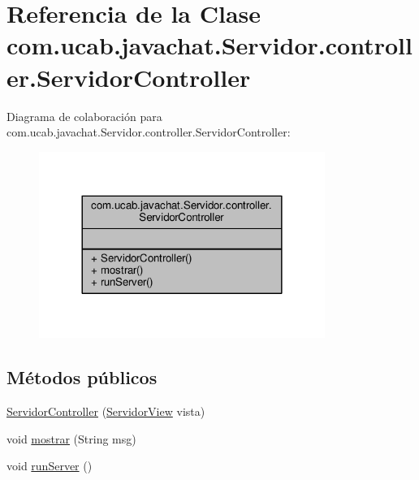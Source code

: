 \hypertarget{classcom_1_1ucab_1_1javachat_1_1_servidor_1_1controller_1_1_servidor_controller}{\section{Referencia de la Clase com.\-ucab.\-javachat.\-Servidor.\-controller.\-Servidor\-Controller}
\label{classcom_1_1ucab_1_1javachat_1_1_servidor_1_1controller_1_1_servidor_controller}
}


Diagrama de colaboración para com.\-ucab.\-javachat.\-Servidor.\-controller.\-Servidor\-Controller\-:\nopagebreak
\begin{figure}[H]
\begin{center}
\leavevmode
\includegraphics[width=264pt]{classcom_1_1ucab_1_1javachat_1_1_servidor_1_1controller_1_1_servidor_controller__coll__graph}
\end{center}
\end{figure}
\subsection*{Métodos públicos}
\begin{DoxyCompactItemize}
\item 
\hyperlink{classcom_1_1ucab_1_1javachat_1_1_servidor_1_1controller_1_1_servidor_controller_a36f238b4a06304d92f09c51ca60c31e5}{Servidor\-Controller} (\hyperlink{classcom_1_1ucab_1_1javachat_1_1_servidor_1_1view_1_1_servidor_view}{Servidor\-View} vista)
\item 
void \hyperlink{classcom_1_1ucab_1_1javachat_1_1_servidor_1_1controller_1_1_servidor_controller_a73afbbd665ab0cdb6bfb58e1726ffe3c}{mostrar} (String msg)
\item 
void \hyperlink{classcom_1_1ucab_1_1javachat_1_1_servidor_1_1controller_1_1_servidor_controller_a363c2a7d307466fc9afd04fa3de32b68}{run\-Server} ()
\end{DoxyCompactItemize}


